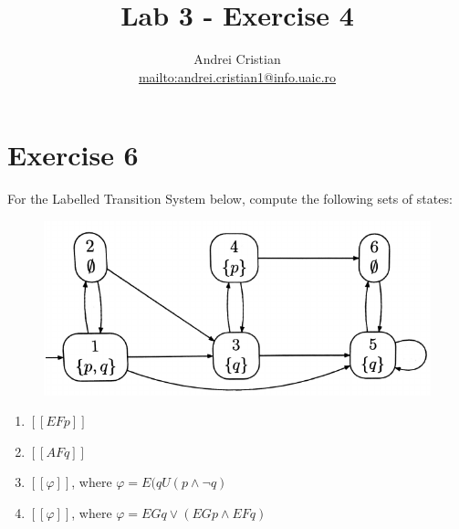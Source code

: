 \documentclass[10pt,a4paper]{article}
\author{Andrei Cristian\\\url{mailto:andrei.cristian1@info.uaic.ro}}
\title{Lab 3 - Exercise 4}
\begin{document}
\newcommand{\llbracket}{[\![}
\newcommand{\rrbracket}{]\!]}
\maketitle
\section{Exercise 6}
For the Labelled Transition System below, compute the following sets of states:

\begin{figure}[ht]
\centering
\includegraphics[scale=0.6]{ex4_labelled_transition_system.png}
\end{figure}

\begin{enumerate}
\item $\llbracket EFp \rrbracket$
\item $\llbracket AFq \rrbracket$
\item $\llbracket \varphi \rrbracket$, where $\varphi = E( q{U} (p \wedge \neg q )$
\item $\llbracket \varphi \rrbracket$, where $\varphi = EGq \vee ( EGp \wedge EFq )$
\end{enumerate}
\end{document}

